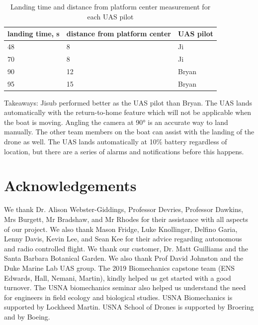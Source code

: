 \documentclass{wrcecapstone}
\begin{document}
\begin{table}
\caption{Landing time and distance from platform center measurement for each UAS pilot}
\label{tab:9.2.2}
\begin{center}
\begin{tabular}{lll}
\toprule
landing time, \si{\second} & distance from platform center & UAS pilot \\
\midrule
48 & 8 & Ji \\
70 & 8 & Ji \\
90 & 12 & Bryan \\
95 & 15 & Bryan \\
\bottomrule
\end{tabular}
\end{center}
\end{table}
 
Takeaways: 
Jisub performed better as the UAS pilot than Bryan. The UAS lands automatically with the return-to-home feature which will not be applicable when the boat is moving. Angling the camera at \ang{90} is an accurate way to land manually. The other team members on the boat can assist with the landing of the drone as well. The UAS lands automatically at 10\% battery regardless of location, but there are a series of alarms and notifications before this happens.












\section*{Acknowledgements}
We thank Dr. Alison Webster-Giddings, Professor Devries, Professor Dawkins, Mrs Burgett, Mr Bradshaw, and Mr Rhodes for their assistance with all aspects of our project. We also thank Mason Fridge, Luke Knollinger, Delfino Garia, Lenny Davis, Kevin Lee, and Sean Kee for their advice regarding autonomous and radio controlled flight. We thank our customer, Dr. Matt Guilliams and the Santa Barbara Botanical Garden. We also thank Prof David Johnston and the Duke Marine Lab UAS group. The 2019 Biomechanics capstone team (ENS Edwards, Hall, Nemani, Martin), kindly helped us get started with a good turnover. The USNA biomechanics seminar also helped us understand the need for engineers in field ecology and biological studies. USNA Biomechanics is supported by Lockheed Martin. USNA School of Drones is supported by Broering and by Boeing. 

\nocite{hyneman2017jamie, famoussmoke2019cigar} %



\clearpage
\appendix
\renewcommand{\figurename}{Supplementary Figure}
\renewcommand{\thefigure}{S\arabic{figure}}




\end{document}
